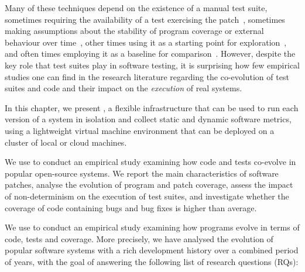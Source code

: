 Many of these techniques depend on the existence of a manual test suite,
sometimes requiring the availability of a test exercising the
patch~\cite{onlinevalidation,tachyon12}, sometimes making assumptions about the
stability of program coverage or external behaviour over
time~\cite{cov_regr97,mx}, other times using it as a starting point for
exploration~\cite{zesti,pretex,sage,test-augmentation:genetic-vs-concolic}, and
often times employing it as a baseline for
comparison~\cite{klee,dotnet-random-test08,semantic-fp-testing12,mutation-tests-oracle12}.
However, despite the key role that test suites play in software testing, it is
surprising how few empirical studies one can find in the research literature
regarding the co-evolution of test suites and code and their impact on the
\emph{execution} of real systems.

In this chapter, we present \covrig, a flexible infrastructure that can be used
to run each version of a system in isolation and collect static and dynamic
software metrics, using a lightweight virtual machine environment that can be
deployed on a cluster of local or cloud machines.

We use \covrig to conduct an empirical study examining how code and tests
co-evolve in \numSystems popular open-source systems.  We report the main
characteristics of software patches, analyse the evolution of program and patch
coverage, assess the impact of non-determinism on the execution of test suites,
and investigate whether the coverage of code containing bugs and bug fixes is
higher than average.

We use \covrig to conduct an empirical study examining how programs evolve in
terms of code, tests and coverage.  More precisely, we have analysed the
evolution of \numSystems popular software systems with a rich development
history over a combined period of \numYears years, with the goal of answering
the following list of research questions (RQs):

